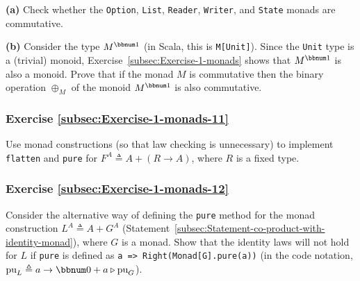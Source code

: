 \textbf{(a)} Check whether the \lstinline!Option!, \lstinline!List!,
\lstinline!Reader!, \lstinline!Writer!, and \lstinline!State! monads
are commutative.

\textbf{(b)} Consider the type $M^{\bbnum 1}$ (in Scala, this is
\lstinline!M[Unit]!). Since the \lstinline!Unit! type is a (trivial)
monoid, Exercise~\ref{subsec:Exercise-1-monads} shows that $M^{\bbnum 1}$
is also a monoid. Prove that if the monad $M$ is commutative then
the binary operation $\oplus_{M}$ of the monoid $M^{\bbnum 1}$ is
also commutative. 

\begin{comment}
Solution

The code is converted into monad methods like this,
\begin{align*}
 & r_{1}=p\triangleright\text{flm}_{M}(x\rightarrow q\triangleright(y\rightarrow f(x,y))^{\uparrow M})\quad,\\
 & r_{2}=q\triangleright\text{flm}_{M}(y\rightarrow p\triangleright(x\rightarrow f(x,y))^{\uparrow M})\quad.
\end{align*}
The monoid operation $\oplus_{M}$ is defined by
\[
p^{:M^{\bbnum 1}}\oplus_{M}q^{:M^{\bbnum 1}}\triangleq p\triangleright\text{flm}_{M}(1\rightarrow q)=p\triangleright(1\rightarrow q)^{\uparrow M}\bef\text{ftn}_{M}\quad.
\]
Commutativity of $\oplus_{M}$ means that
\[
p\oplus_{M}q=q\oplus_{M}p=q\triangleright\text{flm}_{M}(1\rightarrow p)=q\triangleright(1\rightarrow p)^{\uparrow M}\bef\text{ftn}_{M}\quad.
\]
Use $f(x,y)\triangleq1$ in the above conditions for $r_{1}$, $r_{2}$.
\end{comment}


\subsubsection{Exercise \label{subsec:Exercise-1-monads-11}\ref{subsec:Exercise-1-monads-11}}

Use monad constructions (so that law checking is unnecessary) to implement
\lstinline!flatten! and \lstinline!pure! for $F^{A}\triangleq A+\left(R\rightarrow A\right)$,
where $R$ is a fixed type.

\subsubsection{Exercise \label{subsec:Exercise-1-monads-12}\ref{subsec:Exercise-1-monads-12}}

Consider the alternative way of defining the \lstinline!pure! method
for the monad construction $L^{A}\triangleq A+G^{A}$ (Statement~\ref{subsec:Statement-co-product-with-identity-monad}),
where $G$ is a monad. Show that the identity laws will not hold for
$L$ if \lstinline!pure! is defined as \lstinline!a => Right(Monad[G].pure(a))!
(in the code notation, $\text{pu}_{L}\triangleq a\rightarrow\bbnum 0+a\triangleright\text{pu}_{G}$).

